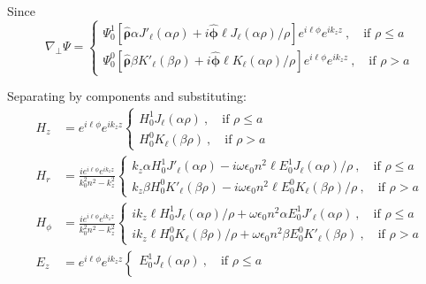 Since 
\begin{equation*}
	\nabla_\perp \Psi =
	\left\{	
	\begin{matrix}
		\Psi_0^1\left[\boldsymbol{\hat{\rho}}\alpha J'_\ell (\alpha \rho) + i \boldsymbol{\hat{\phi}} \ell J_\ell (\alpha \rho)/\rho\right] e^{i\ell\phi} e^{i k_z z} \ , \quad \text{if } \rho \le a  
		\\
		\Psi_0^0\left[\boldsymbol{\hat{\rho}}\beta K'_\ell (\beta\rho) +i \boldsymbol{\hat{\phi}}\ell K_\ell (\alpha \rho)/\rho \right]e^{i\ell\phi} e^{i k_z z} \ , \quad \text{if } \rho > a  
	\end{matrix}
	\right.
\end{equation*}

Separating by components and substituting:
\begin{align*}
		H_z &=  e^{i\ell\phi}e^{i k_z z}
	  	 \left\{
		\begin{matrix}	  	 
	  	 H_0^1 J_\ell (\alpha \rho) \ , \quad \text{if } \rho \le a  
	  	 \\
	  	 H_0^0 K_\ell (\beta \rho) \ , \quad \text{if } \rho > a  
	  	 \end{matrix}
	  	 \right.	
		\\
	  	 H_r &= \frac{i e^{i\ell\phi}e^{i k_z z} }{k_0^2 n^2 - k_z^2}
	  	 \left\{
		\begin{matrix}	  	 
	  	  k_z \alpha H_0^1 J'_\ell (\alpha \rho) - i\omega \epsilon_0 n^2\ell E_0^1 J_\ell (\alpha \rho)/\rho \ , \quad \text{if } \rho \le a  
	  	 \\
	  	 k_z \beta H_0^0  K'_\ell (\beta \rho) - i\omega \epsilon_0 n^2\ell E_0^0 K_\ell (\beta \rho)/\rho \ , \quad \text{if } \rho > a  
	  	 \end{matrix}
	  	 \right.
	  	 \\
		H_\phi &= \frac{ie^{i\ell\phi} e^{i k_z z}}{k_0^2 n^2 - k_z^2}
		\left\{
		\begin{matrix}
			ik_z\ell H_0^1  J_\ell (\alpha \rho)/\rho + \omega \epsilon_0 n^2  \alpha E_0^1 J'_\ell (\alpha \rho) \ , \quad \text{if } \rho \le a  
			\\
			ik_z \ell H_0^0  K_\ell (\beta \rho)/\rho + \omega \epsilon_0 n^2 \beta E_0^0  K'_\ell (\beta \rho) \ , \quad \text{if } \rho > a  
		\end{matrix}
		\right.
		\\
		E_z &= e^{i\ell\phi} e^{i k_z z}
	  	 \left\{
		\begin{matrix}	  	 
	  	 E_0^1 J_\ell (\alpha \rho) \ , \quad \text{if } \rho \le a  
	  	 \\

\end{matrix}
\end{align*}
